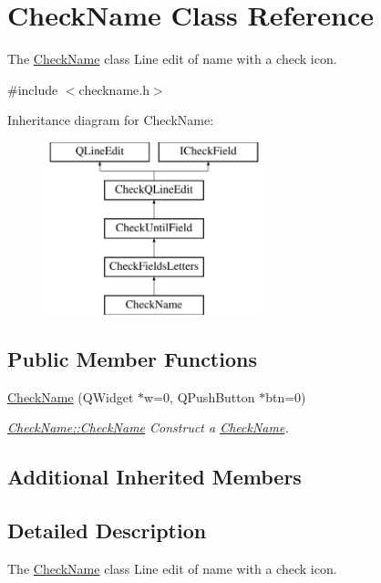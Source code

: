 \hypertarget{classCheckName}{\section{Check\+Name Class Reference}
\label{classCheckName}
}


The \hyperlink{classCheckName}{Check\+Name} class Line edit of name with a check icon.  




{\ttfamily \#include $<$checkname.\+h$>$}

Inheritance diagram for Check\+Name\+:\begin{figure}[H]
\begin{center}
\leavevmode
\includegraphics[height=5.000000cm]{dc/d14/classCheckName}
\end{center}
\end{figure}
\subsection*{Public Member Functions}
\begin{DoxyCompactItemize}
\item 
\hyperlink{classCheckName_a4a7fe601d6fd5e8576498e2d953df614}{Check\+Name} (Q\+Widget $\ast$w=0, Q\+Push\+Button $\ast$btn=0)
\begin{DoxyCompactList}\small\item\em \hyperlink{classCheckName_a4a7fe601d6fd5e8576498e2d953df614}{Check\+Name\+::\+Check\+Name} Construct a \hyperlink{classCheckName}{Check\+Name}. \end{DoxyCompactList}\end{DoxyCompactItemize}
\subsection*{Additional Inherited Members}


\subsection{Detailed Description}
The \hyperlink{classCheckName}{Check\+Name} class Line edit of name with a check icon. 

